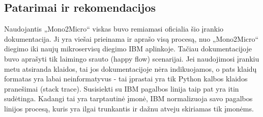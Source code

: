 \documentclass{VUMIFPSbakalaurinis}
\begin{document}
\subsection{Patarimai ir rekomendacijos} %
Naudojantis „Mono2Micro“ viskas buvo remiamasi oficialia šio įrankio dokumentacija. Ji yra viešai prieinama ir aprašo visą procesą, nuo „Mono2Micro“ diegimo iki naujų mikroservisų diegimo IBM aplinkoje. Tačiau dokumentacijoje buvo aprašyti tik laimingo srauto (happy flow) scenarijai. Jei naudojimosi įrankiu metu atsiranda klaidos, tai jos dokumentacijoje nėra indikuojamos, o pats klaidų formatas yra labai neinformatyvus - tai įprastai yra tik Python kalbos klaidos pranešimai (stack trace). Susisiekti su IBM pagalbos linija taip pat yra itin sudėtinga. Kadangi tai yra tarptautinė įmonė, IBM normalizuoja savo pagalbos linijos procesą, kuris yra ilgai trunkantis ir dažnu atveju skiriamas tik įmonėms.
\end{document}
